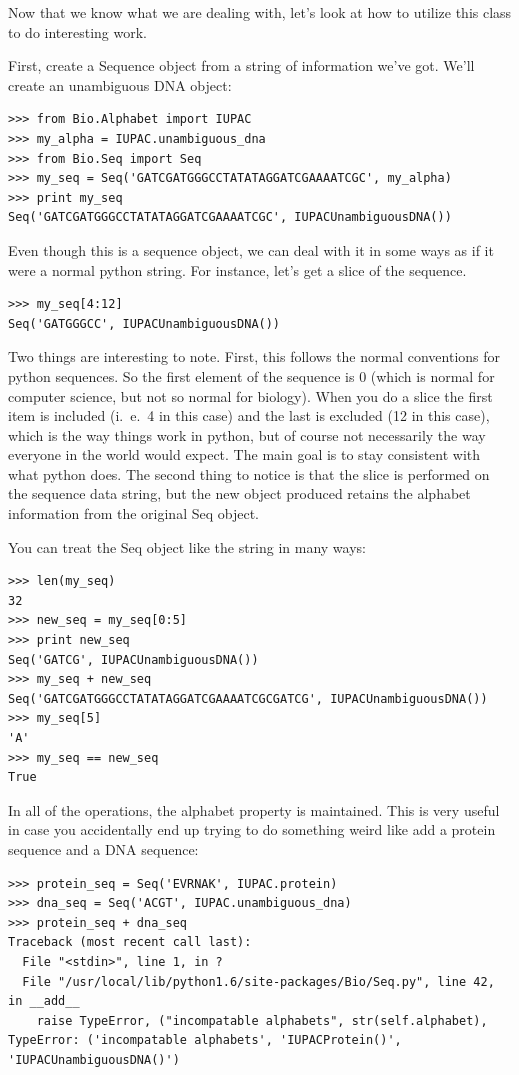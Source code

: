 \documentclass{report}
\begin{document}
Now that we know what we are dealing with, let's look at how to utilize this class to do interesting work.


First, create a Sequence object from a string of information we've got. We'll create an unambiguous DNA object:

\begin{verbatim}
>>> from Bio.Alphabet import IUPAC
>>> my_alpha = IUPAC.unambiguous_dna
>>> from Bio.Seq import Seq
>>> my_seq = Seq('GATCGATGGGCCTATATAGGATCGAAAATCGC', my_alpha)
>>> print my_seq
Seq('GATCGATGGGCCTATATAGGATCGAAAATCGC', IUPACUnambiguousDNA())
\end{verbatim}


Even though this is a sequence object, we can deal with it in some ways as if it were a normal python string. For instance, let's get a slice of the sequence.

\begin{verbatim}
>>> my_seq[4:12]
Seq('GATGGGCC', IUPACUnambiguousDNA())
\end{verbatim}

Two things are interesting to note. First, this follows the normal conventions for python sequences.  So the first element of the sequence is 0 (which is normal for computer science, but not so normal for biology). When you do a slice the first item is included (i.~e.~4 in this case) and the last is excluded (12 in this case), which is the way things work in python, but of course not necessarily the way everyone in the world would expect. The main goal is to stay consistent with what python does. The second thing to notice is that the slice is performed on the sequence data string, but the new object produced retains the alphabet information from the original Seq object.


You can treat the Seq object like the string in many ways:

\begin{verbatim}
>>> len(my_seq)
32
>>> new_seq = my_seq[0:5]
>>> print new_seq
Seq('GATCG', IUPACUnambiguousDNA())
>>> my_seq + new_seq
Seq('GATCGATGGGCCTATATAGGATCGAAAATCGCGATCG', IUPACUnambiguousDNA())
>>> my_seq[5]
'A'
>>> my_seq == new_seq
True
\end{verbatim}

In all of the operations, the alphabet property is maintained. This is very useful in case you accidentally end up trying to do something weird like add a protein sequence and a DNA sequence:

\begin{verbatim}
>>> protein_seq = Seq('EVRNAK', IUPAC.protein)
>>> dna_seq = Seq('ACGT', IUPAC.unambiguous_dna)
>>> protein_seq + dna_seq
Traceback (most recent call last):
  File "<stdin>", line 1, in ?
  File "/usr/local/lib/python1.6/site-packages/Bio/Seq.py", line 42, in __add__
    raise TypeError, ("incompatable alphabets", str(self.alphabet),
TypeError: ('incompatable alphabets', 'IUPACProtein()', 'IUPACUnambiguousDNA()')
\end{verbatim}
\end{document}
